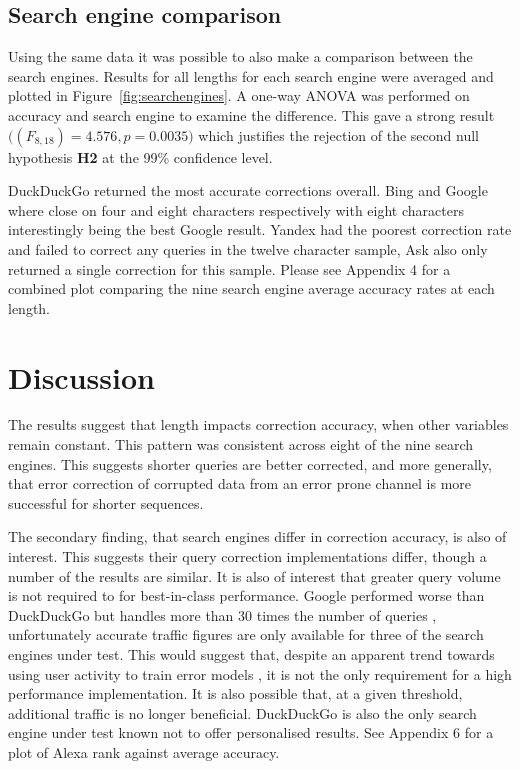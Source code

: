 \documentclass{csfourzero}
\begin{document}
\subsection{Search engine comparison}
Using the same data it was possible to also make a comparison between the search engines. Results for all lengths for each search engine were averaged and plotted in Figure~\ref{fig:searchengines}. A one-way ANOVA was performed on accuracy and search engine to examine the difference. This gave a strong result $\big((F_{8,18}) = 4.576, p = 0.0035\big)$ which justifies the rejection of the second null hypothesis \textbf{H2} at the 99\% confidence level.

DuckDuckGo returned the most accurate corrections overall. Bing and Google where close on four and eight characters respectively with eight characters interestingly being the best Google result. Yandex had the poorest correction rate and failed to correct any queries in the twelve character sample, Ask also only returned a single correction for this sample. Please see Appendix 4 for a combined plot comparing the nine search engine average accuracy rates at each length.

\section{Discussion}
\label{sec:discuss}

The results suggest that length impacts correction accuracy, when other variables remain constant. This pattern was consistent across eight of the nine search engines. This suggests shorter queries are better corrected, and more generally, that error correction of corrupted data from an error prone channel is more successful for shorter sequences.

The secondary finding, that search engines differ in correction accuracy, is also of interest. This suggests their query correction implementations differ, though a number of the results are similar. It is also of interest that greater query volume is not required to for best-in-class performance. Google performed worse than DuckDuckGo but handles more than 30 times the number of queries \cite{enginecomparewiki}, unfortunately accurate traffic figures are only available for three of the search engines under test. This would suggest that, despite an apparent trend towards using user activity to train error models \cite{webuserpoweredspelling, webuser3, webuser2learningerrormodel, webuser4google2009}, it is not the only requirement for a high performance implementation. It is also possible that, at a given threshold, additional traffic is no longer beneficial. DuckDuckGo is also the only search engine under test known not to offer personalised results. See Appendix 6 for a plot of Alexa rank against average accuracy.
\end{document}
